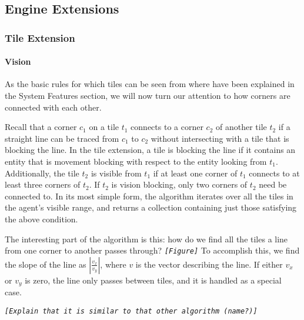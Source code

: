 
\subsection{Engine Extensions}


\subsubsection{Tile Extension}


\paragraph*{Vision}

As the basic rules for which tiles can be seen from where have been
explained in the System Features section, we will now turn our attention
to how corners are connected with each other. 

Recall that a corner $c_{1}$ on a tile $t_{1}$ connects to a corner
$c_{2}$ of another tile $t_{2}$ if a straight line can be traced
from $c_{1}$ to $c_{2}$ without intersecting with a tile that is
blocking the line. In the tile extension, a tile is blocking the line
if it contains an entity that is movement blocking with respect to
the entity looking from $t_{1}$. Additionally, the tile $t_{2}$
is visible from $t_{1}$ if at least one corner of $t_{1}$ connects
to at least three corners of $t_{2}$. If $t_{2}$ is vision blocking,
only two corners of $t_{2}$ need be connected to. In its most simple
form, the algorithm iterates over all the tiles in the agent's visible
range, and returns a collection containing just those satisfying the
above condition. 

The interesting part of the algorithm is this: how do we find all
the tiles a line from one corner to another passes through? \texttt{\emph{{[}Figure{]}}}
To accomplish this, we find the slope of the line as $\left|\frac{v_{x}}{v_{y}}\right|$,
where $v$ is the vector describing the line. If either $v_{x}$ or
$v_{y}$ is zero, the line only passes between tiles, and it is handled
as a special case.

\texttt{\emph{{[}Explain that it is similar to that other algorithm
(name?){]}}}
